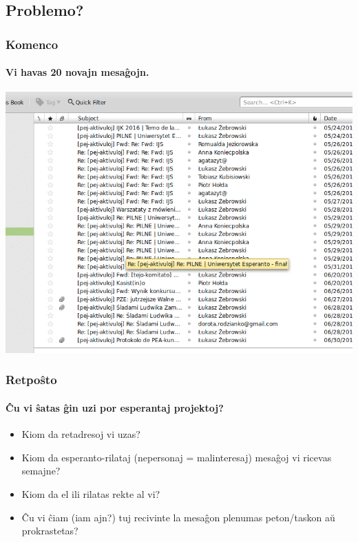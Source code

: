 \subsection{Problemo?}

  \begin{frame}
    \frametitle{Komenco}
    \framesubtitle{Vi havas 20 novajn mesaĝojn.}
    
  \begin{center}
    	\includegraphics[scale=0.3]{ekranoj/retposhto}
	\end{center}
  \end{frame}
 

  \begin{frame}
    \frametitle{Retpoŝto}
    \framesubtitle{Ĉu vi ŝatas ĝin uzi por esperantaj projektoj?}
    \begin{itemize}
    	\item Kiom da retadresoj vi uzas?
    	\item Kiom da esperanto-rilataj (nepersonaj = malinteresaj) mesaĝoj vi ricevas semajne?
    	\item Kiom da el ili rilatas rekte al vi?
    	\item Ĉu vi ĉiam (iam ajn?) tuj recivinte la mesaĝon plenumas peton/taskon aŭ prokrastetas?
    \end{itemize}
  \end{frame}
   
